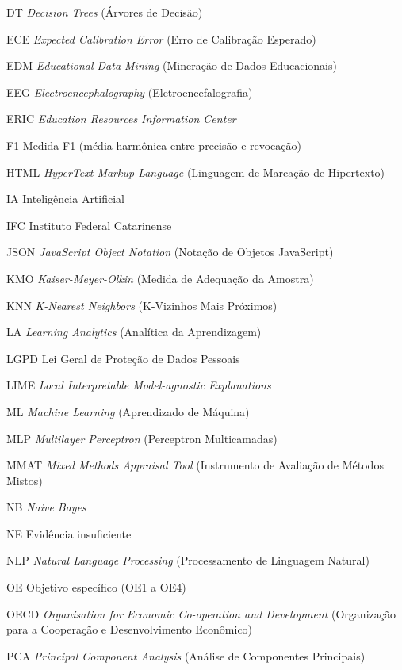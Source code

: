 \documentclass[
	12pt,
	oneside,
	a4paper,
	chapter=TITLE,
	section=TITLE,
	subsection=TITLE,
	english,
	brazil,
	sumario=tradicional,
]{abntex2-IFC}
\begin{document}
\begin{siglas}
  \item[DT] \textit{Decision Trees} (Árvores de Decisão)
  \item[ECE] \textit{Expected Calibration Error} (Erro de Calibração Esperado)
  \item[EDM] \textit{Educational Data Mining} (Mineração de Dados Educacionais)
  \item[EEG] \textit{Electroencephalography} (Eletroencefalografia)
  \item[ERIC] \textit{Education Resources Information Center}
  \item[F1] Medida F1 (média harmônica entre precisão e revocação)
  \item[HTML] \textit{HyperText Markup Language} (Linguagem de Marcação de Hipertexto)
  \item[IA] Inteligência Artificial
  \item[IFC] Instituto Federal Catarinense
  \item[JSON] \textit{JavaScript Object Notation} (Notação de Objetos JavaScript)
  \item[KMO] \textit{Kaiser-Meyer-Olkin} (Medida de Adequação da Amostra)
  \item[KNN] \textit{K-Nearest Neighbors} (K-Vizinhos Mais Próximos)
  \item[LA] \textit{Learning Analytics} (Analítica da Aprendizagem)
  \item[LGPD] Lei Geral de Proteção de Dados Pessoais
  \item[LIME] \textit{Local Interpretable Model-agnostic Explanations}
  \item[ML] \textit{Machine Learning} (Aprendizado de Máquina)
  \item[MLP] \textit{Multilayer Perceptron} (Perceptron Multicamadas)
  \item[MMAT] \textit{Mixed Methods Appraisal Tool} (Instrumento de Avaliação de Métodos Mistos)
  \item[NB] \textit{Naive Bayes}
  \item[NE] Evidência insuficiente
  \item[NLP] \textit{Natural Language Processing} (Processamento de Linguagem Natural)
  \item[OE] Objetivo específico (OE1 a OE4)
  \item[OECD] \textit{Organisation for Economic Co-operation and Development} (Organização para a Cooperação e Desenvolvimento Econômico)
  \item[PCA] \textit{Principal Component Analysis} (Análise de Componentes Principais)

\end{siglas}
\end{document}
